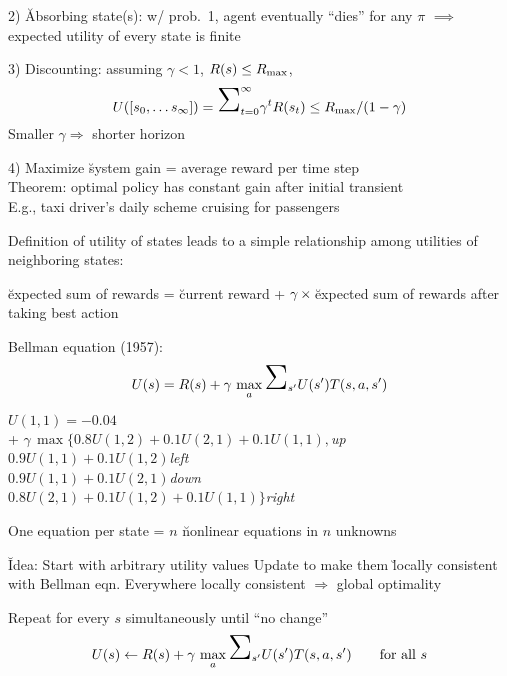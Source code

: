 \documentclass{article}
\begin{document}
\begin{huge}
2) \u{Absorbing state(s)}: w/ prob.~1, agent eventually ``dies'' for any $\pi$\al
  $\implies$ expected utility of every state is finite

3) Discounting: assuming $\gamma<1$, $R(s) \leq R_{{\rm max}}$,
\[ U([s_0,\ldots s_{\infty}]) = \mysum_{t=0}^{\infty} \gamma^t R(s_t) \leq R_{{\rm max}}/(1-\gamma)\]
Smaller $\gamma \Rightarrow {}$ shorter horizon

4) Maximize \u{system gain} = average reward per time step\\
Theorem: optimal policy has constant gain after initial transient\\
E.g., taxi driver's daily scheme cruising for passengers




Definition of utility of states leads to a simple relationship among
utilities of neighboring states:

\u{expected sum of rewards}\al
= \u{current reward}\nl
+ $\gamma {\,\times\,}{}$\u{expected sum of rewards after taking best action}

Bellman equation (1957):
\[ U(s) = R(s) + \gamma\,\max_a \mysum_{s'} U(s') T(s,a,s')\]

$U(1,1) = -0.04$\\
\tab + $\gamma\,\max\{ 0.8 U(1,2) + 0.1 U(2,1) + 0.1 U(1,1),$\hfill{\em up}\\
\tab \phantom{+ \mbox{$\max\{$}}$0.9 U(1,1) + 0.1 U(1,2) $\hfill{\em left}\\
\tab \phantom{+ \mbox{$\max\{$}}$0.9 U(1,1) + 0.1 U(2,1) $\hfill{\em down}\\
\tab \phantom{+ \mbox{$\max\{$}}$0.8 U(2,1) + 0.1 U(1,2) + 0.1 U(1,1) \}$\hfill{\em right}

One equation per state = $n$ \u{nonlinear} equations in $n$ unknowns



\u{Idea}: Start with arbitrary utility values\nl
          Update to make them \u{locally consistent} with Bellman eqn.\nl
          Everywhere locally consistent $\Rightarrow$ global optimality

Repeat for every $s$ simultaneously until ``no change''
\[ U(s) \leftarrow R(s) + \gamma\,\max_a \mysum_{s'} U(s') T(s,a,s') \qquad \mbox{for all } s\]


\end{huge}
\end{document}

